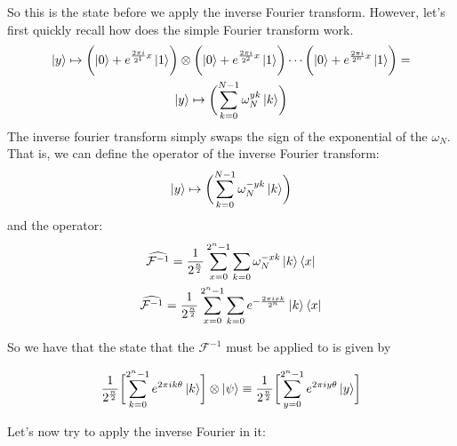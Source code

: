 So this is the state before we apply the inverse Fourier transform. However, let's first quickly recall how does the simple Fourier transform work.
\begin{gather}
  \ket{y} \mapsto \biggl(\ket{0} + e^{\frac{2\pi i}{2^1}x}\ket{1}\biggr)\otimes \biggl(\ket{0} + e^{\frac{2\pi i}{2^2}x}\ket{1}\biggr) \cdots \biggl(\ket{0} + e^{\frac{2\pi i}{2^{n}}x}\ket{1}\biggr) = \\
  \ket{y} \mapsto \biggl(\sum_{k=0}^{N-1}\omega_N^{yk}\ket{k} \biggr)
\end{gather}
The inverse fourier transform simply swaps the sign of the exponential of the $\omega_N$.
That is, we can define the operator of the inverse Fourier transform: 
\begin{gather}
  \ket{y} \mapsto \biggl(\sum_{k=0}^{N-1}\omega_N^{-yk}\ket{k} \biggr) 
\end{gather}
and the operator: 
\begin{gather}
  \widehat{\mathcal{F}^{-1}} = \frac{1}{2^\frac{n}{2}}\sum_{x=0}^{2^n-1}\sum_{k=0} \omega_N^{-xk}\ket{k}\bra{x} \\
  \widehat{\mathcal{F}^{-1}} = \frac{1}{2^\frac{n}{2}}\sum_{x=0}^{2^n-1}\sum_{k=0} e^{-\frac{2\pi ixk}{2^n}}\ket{k}\bra{x}
\end{gather}

So we have that the state that the $\mathcal{F}^{-1}$ must be applied to is given by 

\begin{gather}
  \frac{1}{2^{\frac{n}{2}}}\biggl[ \sum_{k=0}^{2^n-1} e^{2\pi i k \theta} \ket{k} \biggr]\otimes \ket{\psi} \equiv 
  \frac{1}{2^{\frac{n}{2}}}\biggl[ \sum_{y=0}^{2^n-1} e^{2\pi i y \theta} \ket{y} \biggr] 
\end{gather}

Let's now try to apply the inverse Fourier in it: 

